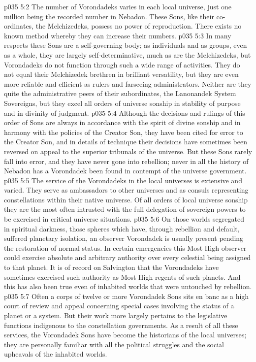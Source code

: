 \pc \vs p035 5:2 The number of Vorondadeks varies in each local universe, just one million being the recorded number in Nebadon. These Sons, like their co\hyp{}ordinates, the Melchizedeks, possess no power of reproduction. There exists no known method whereby they can increase their numbers.
\pc \vs p035 5:3 In many respects these Sons are a self\hyp{}governing body; as individuals and as groups, even as a whole, they are largely self\hyp{}determinative, much as are the Melchizedeks, but Vorondadeks do not function through such a wide range of activities. They do not equal their Melchizedek brethren in brilliant versatility, but they are even more reliable and efficient as rulers and farseeing administrators. Neither are they quite the administrative peers of their subordinates, the Lanonandek System Sovereigns, but they excel all orders of universe sonship in stability of purpose and in divinity of judgment.
\vs p035 5:4 Although the decisions and rulings of this order of Sons are always in accordance with the spirit of divine sonship and in harmony with the policies of the Creator Son, they have been cited for error to the Creator Son, and in details of technique their decisions have sometimes been reversed on appeal to the superior tribunals of the universe. But these Sons rarely fall into error, and they have never gone into rebellion; never in all the history of Nebadon has a Vorondadek been found in contempt of the universe government.
\vs p035 5:5 The service of the Vorondadeks in the local universes is extensive and varied. They serve as ambassadors to other universes and as consuls representing constellations within their native universe. Of all orders of local universe sonship they are the most often intrusted with the full delegation of sovereign powers to be exercised in critical universe situations.
\vs p035 5:6 On those worlds segregated in spiritual darkness, those spheres which have, through rebellion and default, suffered planetary isolation, an observer Vorondadek is usually present pending the restoration of normal status. In certain emergencies this Most High observer could exercise absolute and arbitrary authority over every celestial being assigned to that planet. It is of record on Salvington that the Vorondadeks have sometimes exercised such authority as Most High regents of such planets. And this has also been true even of inhabited worlds that were untouched by rebellion.
\vs p035 5:7 Often a corps of twelve or more Vorondadek Sons sits en banc as a high court of review and appeal concerning special cases involving the status of a planet or a system. But their work more largely pertains to the legislative functions indigenous to the constellation governments. As a result of all these services, the Vorondadek Sons have become the historians of the local universes; they are personally familiar with all the political struggles and the social upheavals of the inhabited worlds.\plusone
